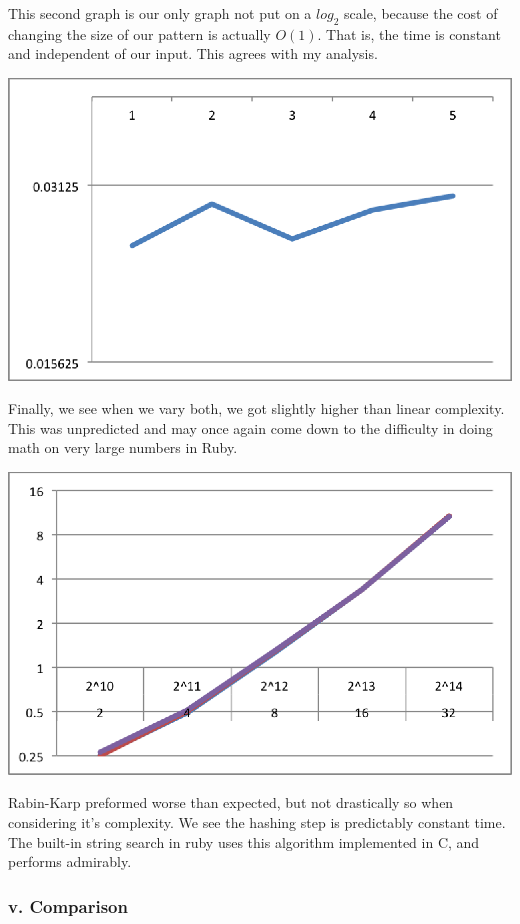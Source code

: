\documentclass{chi2005}
\begin{document}
This second graph is our only graph not put on a $log_2$ scale, because the cost of changing the size of our pattern is actually $O(1)$. That is, the time is constant and independent of our input. This agrees with my analysis.

\includegraphics[scale=0.7]{RKFixedN.eps}

Finally, we see when we vary both, we got slightly higher than linear complexity. This was unpredicted and may once again come down to the difficulty in doing math on very large numbers in Ruby. 

\includegraphics[scale=0.7]{RKVar.eps}

Rabin-Karp preformed worse than expected, but not drastically so when considering it's complexity. We see the hashing step is predictably constant time. The built-in string search in ruby uses this algorithm implemented in C, and performs admirably.

\subsubsection{v. Comparison}
\end{document}
